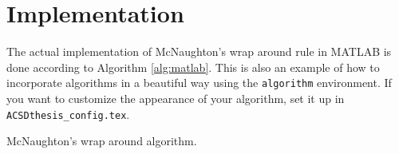 \chapter{Implementation}
The actual implementation of McNaughton's wrap around rule in MATLAB is done according to Algorithm \ref{alg:matlab}. This is also an example of how to incorporate algorithms in a beautiful way using the \texttt{algorithm} environment. If you want to customize the appearance of your algorithm, set it up in \texttt{ACSDthesis\_config.tex}. 

\begin{algorithm}[h]
\caption{McNaughton's wrap around algorithm.}
\label{alg:matlab}
\end{algorithm}










